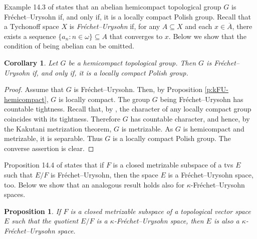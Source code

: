 \documentclass[preprint,11pt]{elsarticle}
\newtheorem{corollary}[theorem]{Corollary}
\newtheorem{proposition}[theorem]{Proposition}
\theoremstyle{definition}
\theoremstyle{remark}
\numberwithin{equation}{section}
\numberwithin{theorem}{section}
\newcommand{\w}{\omega}
\begin{document}
Example 14.3 of \cite{kak} states that an abelian hemicompact topological group $G$ is Fr\'{e}chet--Urysohn if, and only if, it is a locally compact Polish group. Recall that a Tychonoff space $X$ is {\em Fr\'{e}chet--Urysohn} if, for any $A\subseteq X$ and each $x\in \overline{A}$, there exists a sequence $\{a_n: n\in \w\}\subseteq A$ that converges to $x$. Below we show that the condition of being abelian can be omitted.


\begin{corollary} \label{c:FU-hemicompact}
Let $G$ be a hemicompact topological group. Then $G$ is Fr\'{e}chet--Urysohn if, and only if, it is a locally compact Polish group.
\end{corollary}

\begin{proof}
Assume that $G$ is Fr\'{e}chet--Urysohn. Then, by Proposition \ref{p:kFU-hemicompact}, $G$ is locally compact. The group $G$ being Fr\'{e}chet--Urysohn has countable tightness. Recall that, by \cite{Ismail}, the character of any locally compact group coincides with its tightness. Therefore $G$ has countable character, and hence, by the Kakutani metrization theorem, $G$ is metrizable. As $G$ is hemicompact and metrizable, it is separable. Thus $G$ is  a locally compact Polish group. The converse assertion is clear.
\end{proof}

Proposition 14.4 of \cite{kak} states that if $F$ is a closed metrizable subspace of a tvs $E$ such that $E/F$ is Fr\'{e}chet--Urysohn, then the space $E$ is a Fr\'{e}chet--Urysohn space, too. Below we show that an analogous result holds also for $\kappa$-Fr\'{e}chet--Urysohn spaces.

\begin{proposition} \label{p:kFU-metriz-quot}
If $F$ is a closed metrizable subspace of a topological vector space $E$ such that the quotient $E/F$ is a $\kappa$-Fr\'{e}chet--Urysohn space, then  $E$ is also a $\kappa$-Fr\'{e}chet--Urysohn space.
\end{proposition}
\end{document}
